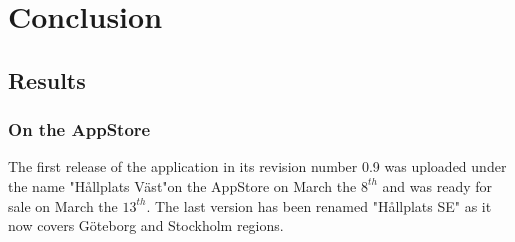 \chapter{Conclusion}
\label{cha:conclusion}

\section{Results}

\subsection{On the AppStore}

The first release of the application in its revision number 0.9 was uploaded under the name "Hållplats Väst"on the AppStore on March the $8^{th}$ and was ready for sale on March the $13^{th}$. The last version has been renamed "Hållplats SE" as it now covers Göteborg and Stockholm regions.

